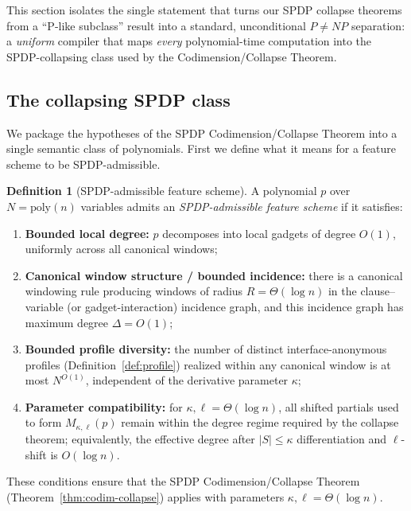 \documentclass[12pt]{article}
\newcommand{\poly}{\mathrm{poly}}
\theoremstyle{definition}
\newtheorem{definition}{Definition}
\theoremstyle{definition}
\theoremstyle{remark}
\theoremstyle{remark}
\begin{document}
This section isolates the single statement that turns our SPDP collapse
theorems from a ``P-like subclass'' result into a standard, unconditional
$P\neq NP$ separation: a \emph{uniform} compiler that maps \emph{every}
polynomial-time computation into the SPDP-collapsing class used by the
Codimension/Collapse Theorem.

\subsection{The collapsing SPDP class}
\label{subsec:collapsing-class}

We package the hypotheses of the SPDP Codimension/Collapse Theorem into a
single semantic class of polynomials. First we define what it means for a feature
scheme to be SPDP-admissible.

\begin{definition}[SPDP-admissible feature scheme]
\label{def:spdp-admissible-feature-scheme}
A polynomial $p$ over $N=\poly(n)$ variables admits an \emph{SPDP-admissible feature scheme}
if it satisfies:
\begin{enumerate}[label=(\roman*)]
\item \textbf{Bounded local degree:} $p$ decomposes into local gadgets of degree $O(1)$,
uniformly across all canonical windows;

\item \textbf{Canonical window structure / bounded incidence:}
there is a canonical windowing rule producing windows of radius
$R=\Theta(\log n)$ in the clause--variable (or gadget-interaction) incidence graph,
and this incidence graph has maximum degree $\Delta=O(1)$;

\item \textbf{Bounded profile diversity:}
the number of distinct interface-anonymous profiles
(Definition~\ref{def:profile}) realized within any canonical window is at most
$N^{O(1)}$, independent of the derivative parameter $\kappa$;

\item \textbf{Parameter compatibility:}
for $\kappa,\ell=\Theta(\log n)$, all shifted partials used to form $M_{\kappa,\ell}(p)$
remain within the degree regime required by the collapse theorem; equivalently,
the effective degree after $|S|\le \kappa$ differentiation and $\ell$-shift is
$O(\log n)$.
\end{enumerate}
These conditions ensure that the SPDP Codimension/Collapse Theorem
(Theorem~\ref{thm:codim-collapse}) applies with parameters $\kappa,\ell=\Theta(\log n)$.
\end{definition}
\end{document}
